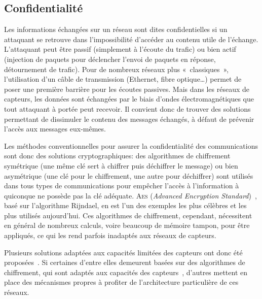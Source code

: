 \subsection{Confidentialité}

Les informations échangées sur un réseau sont dites confidentielles si un attaquant se retrouve dans l'impossibilité d'accéder au contenu utile de l'échange.
L'attaquant peut être passif (simplement à l'écoute du trafic) ou bien actif (injection de paquets pour déclencher l'envoi de paquets en réponse, détournement de trafic).
Pour de nombreux réseaux plus « classiques », l'utilisation d'un câble de transmission (Ethernet, fibre optique\dots) permet de poser une première barrière pour les écoutes passives.
Mais dans les réseaux de capteurs, les données sont échangées par le biais d'ondes électromagnétiques que tout attaquant à portée peut recevoir.
Il convient donc de trouver des solutions permettant de dissimuler le contenu des messages échangés, à défaut de prévenir l'accès aux messages eux-mêmes.

Les méthodes conventionnelles pour assurer la confidentialité des communications sont donc des solutions cryptographiques: des algorithmes de chiffrement symétrique (une même clé sert à chiffrer puis déchiffrer le message) ou bien asymétrique (une clé pour le chiffrement, une autre pour déchiffrer) sont utilisés dans tous types de communications pour empêcher l'accès à l'information à quiconque ne possède pas la clé adéquate.
\textsc{Aes} (\textit{Advanced Encryption Standard})~\cite{aes}, basé sur l'algorithme Rijndael, en est l'un des exemples les plus célèbres et les plus utilisés aujourd'hui.
Ces algorithmes de chiffrement, cependant, nécessitent en général de nombreux calculs, voire beaucoup de mémoire tampon, pour être appliqués, ce qui les rend parfois inadaptés aux réseaux de capteurs.

Plusieurs solutions adaptées aux capacités limitées des capteurs ont donc été proposées~\cite{OX09}.
Si certaines d'entre elles demeurent basées sur des algorithmes de chiffrement, qui sont adaptés aux capacités des capteurs~\cite{SOBMCN11}, d'autres mettent en place des mécanismes propres à profiter de l'architecture particulière de ces réseaux.












